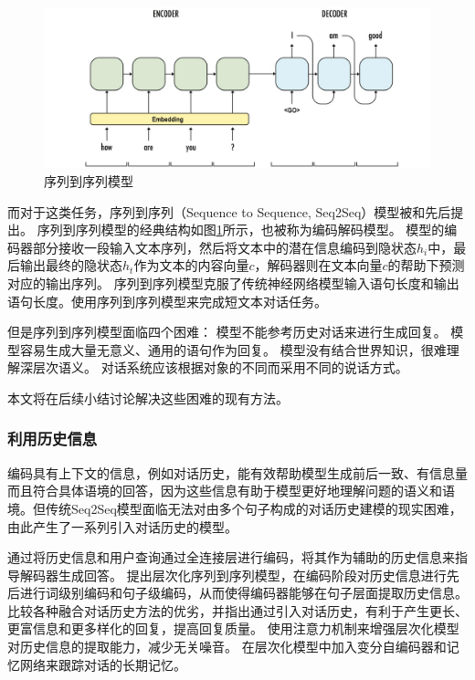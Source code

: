 \documentclass{clv3}
\begin{document}
\begin{figure}[h] %
    \centering %
    \includegraphics[width=1\textwidth]{seq2seq_model} %
    \caption{序列到序列模型} %
    \label{seq2seq_model} %
\end{figure}%

而对于这类任务，序列到序列（Sequence to Sequence, Seq2Seq）模型被\cite{bahdanau2015neural}和\cite{sutskever2014sequence}先后提出。
序列到序列模型的经典结构如图\ref{seq2seq_model}所示，也被称为编码解码模型。
模型的编码器部分接收一段输入文本序列，然后将文本中的潜在信息编码到隐状态$h_i$中，最后输出最终的隐状态$h_t$作为文本的内容向量$c$，解码器则在文本向量$c$的帮助下预测对应的输出序列。
序列到序列模型克服了传统神经网络模型输入语句长度和输出语句长度。\cite{shang2015neural}使用序列到序列模型来完成短文本对话任务。

但是序列到序列模型面临四个困难：
模型不能参考历史对话来进行生成回复。
模型容易生成大量无意义、通用的语句作为回复。
模型没有结合世界知识，很难理解深层次语义。
对话系统应该根据对象的不同而采用不同的说话方式。

本文将在后续小结讨论解决这些困难的现有方法。

\subsubsection{利用历史信息}
编码具有上下文的信息，例如对话历史，能有效帮助模型生成前后一致、有信息量而且符合具体语境的回答，因为这些信息有助于模型更好地理解问题的语义和语境。但传统Seq2Seq模型面临无法对由多个句子构成的对话历史建模的现实困难，由此产生了一系列引入对话历史的模型。

\cite{sordoni2015a}通过将历史信息和用户查询通过全连接层进行编码，将其作为辅助的历史信息来指导解码器生成回答。
\cite{serban2016building}提出层次化序列到序列模型，在编码阶段对历史信息进行先后进行词级别编码和句子级编码，从而使得编码器能够在句子层面提取历史信息。
\cite{tian2017how}比较各种融合对话历史方法的优劣，并指出通过引入对话历史，有利于产生更长、更富信息和更多样化的回复，提高回复质量。
\cite{xing2018hierarchical}使用注意力机制来增强层次化模型对历史信息的提取能力，减少无关噪音。
\cite{serban2017a}在层次化模型中加入变分自编码器和记忆网络来跟踪对话的长期记忆。
\end{document}

